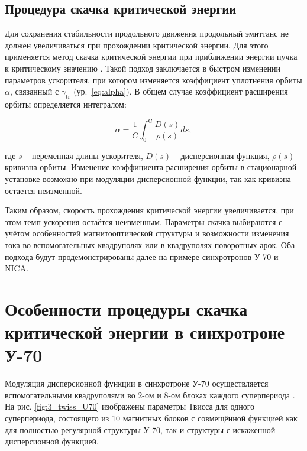 \newpage
\subsection{Процедура скачка критической энергии}

\par Для сохранения стабильности продольного движения продольный эмиттанс не должен увеличиваться при прохождении критической энергии. Для этого применяется метод скачка критической энергии при приближении энергии пучка к критическому значению \cite{risselada:jump}. Такой подход заключается в быстром изменении параметров ускорителя, при котором изменяется коэффициент уплотнения орбиты $\alpha$, связанный с $\gamma_{\textrm{tr}}$ (ур.~\ref{eq:alpha}). В общем случае коэффициент расширения орбиты определяется интегралом:

\begin{equation}
\alpha=\frac{1}{C} \int_0^{\mathrm{C}} \frac{D(s)}{\rho(s)} d s,
\label{eq:alpha_general}
\end{equation}

\noindent где $s$ -- переменная длины ускорителя, $D\left(s\right)$ -- дисперсионная функция, $\rho\left(s\right)$ -- кривизна орбиты. Изменение коэффициента расширения орбиты в стационарной установке возможно при модуляции дисперсионной функции, так как кривизна остается неизменной. 

\par Таким образом, скорость прохождения критической энергии увеличивается, при этом темп ускорения остаётся неизменным. Параметры скачка выбираются с учётом особенностей магнитооптической структуры и возможности изменения тока во вспомогательных квадруполях или в квадруполях поворотных арок. Оба подхода будут продемонстрированы далее на примере синхротронов У-70 и NICA.

\section{Особенности процедуры скачка критической энергии в синхротроне У-70}

\par Модуляция дисперсионной функции в синхротроне У-70 осуществляется вспомогательными квадруполями во $2$-ом и $8$-ом блоках каждого суперпериода \cite{cherniy:ihep}. На рис. \ref{fig:3_twiss_U70} изображены параметры Твисса для одного суперпериода, состоящего из 10 магнитных блоков с совмещённой функцией как для полностью регулярной структуры У-70, так и структуры с искаженной дисперсионной функцией.

